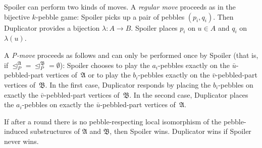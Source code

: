 \documentclass[]{lmcs}
\newcommand{\defining}[1]{\emph{#1}}
\newcommand{\tup}[1]{\bar{#1}}
\newcommand{\vertA}{u}
\newcommand{\vertB}{v}
\newcommand{\StructA}{\mathfrak{A}}
\newcommand{\StructB}{\mathfrak{B}}
\newcommand{\StructVA}{A}
\newcommand{\StructVB}{B}
\newcommand{\gamebij}{\lambda}
\newcommand{\indRel}{\trianglelefteq}
\begin{document}
Spoiler can perform two kinds of moves.
A \defining{regular move} proceeds as in the bijective $k$-pebble game:
Spoiler picks up a pair of pebbles $(p_i, q_i)$.
Then Duplicator provides a bijection $\gamebij\colon \StructVA \to \StructVB$.
Spoiler places $p_i$ on $\vertA \in \StructVA$ and $q_i$ on $\gamebij(\vertA)$.

A \defining{P-move} proceeds as follows and can only be performed once by Spoiler
(that is, if ${\indRel_P^\StructA}={\indRel_P^\StructB}=\emptyset$):
Spoiler chooses to play the $a_i$-pebbles exactly on the
$\tup{\vertA}$-pebbled-part vertices of~$\StructA$
or to play the $b_i$-pebbles exactly on the
$\tup{\vertB}$-pebbled-part vertices of~$\StructB$.
In the first case, 
Duplicator responds by placing the $b_i$-pebbles on exactly  the $\tup{\vertB}$-pebbled-part vertices of~$\StructB$.
In the second case, Duplicator places the $a_i$-pebbles on exactly  the $\tup{\vertA}$-pebbled-part vertices of~$\StructA$.

If after a round there is no pebble-respecting local isomorphism
of the pebble-induced substructures of $\StructA$ and $\StructB$, then Spoiler wins.
Duplicator wins if Spoiler never wins.
\end{document}
